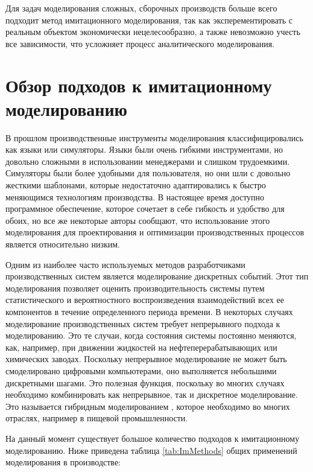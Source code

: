Для задач моделирования сложных, сборочных производств больше всего подходит метод имитационного моделирования, так как эксперементировать с реальным объектом экономически нецелесообразно, а также невозможно учесть все зависимости, что усложняет процесс аналитического моделирования.

\section{Обзор подходов к имитационному моделированию}

В прошлом производственные инструменты моделирования классифицировались как языки или симуляторы. \cite{Velazco} Языки были очень гибкими инструментами, но довольно сложными в использовании менеджерами и слишком трудоемкими. Симуляторы были более удобными для пользователя, но они шли с довольно жесткими шаблонами, которые недостаточно адаптировались к быстро меняющимся технологиям производства. В настоящее время доступно программное обеспечение, которое сочетает в себе гибкость и удобство для обоих, но все же некоторые авторы сообщают, что использование этого моделирования для проектирования и оптимизации производственных процессов является относительно низким. \cite{Benedettini} \cite{Holst}

Одним из наиболее часто используемых методов разработчиками производственных систем является моделирование дискретных событий. \cite{Detty} Этот тип моделирования позволяет оценить производительность системы путем статистического и вероятностного воспроизведения взаимодействий всех ее компонентов в течение определенного периода времени. В некоторых случаях моделирование производственных систем требует непрерывного подхода к моделированию. \cite{Robinson} Это те случаи, когда состояния системы постоянно меняются, как, например, при движении жидкостей на нефтеперерабатывающих или химических заводах. Поскольку непрерывное моделирование не может быть смоделировано цифровыми компьютерами, оно выполняется небольшими дискретными шагами. Это полезная функция, поскольку во многих случаях необходимо комбинировать как непрерывное, так и дискретное моделирование. Это называется гибридным моделированием \cite{inproceedings}, которое необходимо во многих отраслях, например в пищевой промышленности. \cite{Benedettini}

На данный момент существует большое количество подходов к имитационному моделированию. Ниже приведена таблица \ref{tab:ImMethods} общих применений моделирования в производстве\cite{Jahangirian}:

